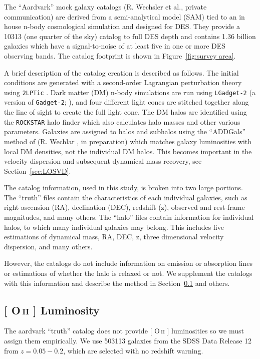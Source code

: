 \documentclass[apj, revtex4]{emulateapj}
\makeatletter
\DeclareRobustCommand{\ion}[2]{%
\relax\ifmmode
\ifx\testbx\f@series
{\mathbf{#1\,\mathsc{#2}}}\else
{\mathrm{#1\,\mathsc{#2}}}\fi
\else\textup{#1\,{\mdseries\textsc{#2}}}%
\fi}
\makeatother
\begin{document}
The ``Aardvark'' mock galaxy catalogs (R. Wechsler et al., private communication) are derived from a semi-analytical model (SAM) tied to an in house n-body cosmological simulation and designed for DES. They provide a 10313 \degsq (one quarter of the sky) catalog to full DES depth and contains 1.36 billion galaxies which have a signal-to-noise of at least five in one or more DES observing bands. The catalog footprint is shown in Figure~\ref{fig:survey area}.

A brief description of the catalog creation is described as follows. The initial conditions are generated with a second-order Lagrangian perturbation theory using {\tt2LPTic} \citep{Crocce2006}. Dark matter (DM) n-body simulations are run using {\tt LGadget-2} (a version of {\tt Gadget-2}; \citealt{Springel2005}), and four different light cones are stitched together along the line of sight to create the full light cone. The DM halos are identified using the {\tt ROCKSTAR} halo finder \citep{Behroozi2013} which also calculates halo masses and other various parameters. Galaxies are assigned to halos and subhalos using the ``ADDGals'' method of (R. Wechlar \etal, in preparation) which matches galaxy luminosities with local DM densities, not the individual DM halos. This becomes important in the velocity dispersion and subsequent dynamical mass recovery, see Section~\ref{sec:LOSVD}.

The catalog information, used in this study, is broken into two large portions. The ``truth'' files contain the characteristics of each individual galaxies, such as right ascension (RA), declination (DEC), redshift (z), observed and rest-frame magnitudes, and many others. The ``halo'' files contain information for individual halos, to which many individual galaxies may belong. This includes five estimations of dynamical mass, RA, DEC, z, three dimensional velocity dispersion, and many others.

However, the catalogs do not include information on emission or absorption lines or estimations of whether the halo is relaxed or not. We supplement the catalogs with this information and describe the method in Section~\ref{sec:oii luminosity} and others. 

\subsection{ {\rm[\ion{O}{ii}]} Luminosity}\label{sec:oii luminosity}
The aardvark ``truth'' catalog does not provide [\ion{O}{ii}] luminosities so we must assign them empirically. We use 503113 galaxies from the SDSS Data Release 12 \citep{Alam2015} from $z = 0.05 - 0.2$, which are selected with no redshift warning. 
\end{document}
